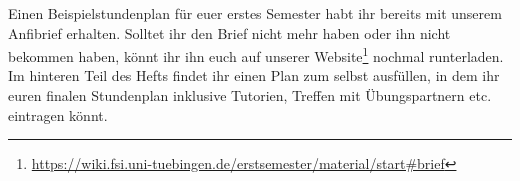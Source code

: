 Einen Beispielstundenplan für euer erstes Semester habt ihr bereits mit unserem Anfibrief erhalten. Solltet ihr den Brief nicht mehr haben oder ihn nicht bekommen haben, könnt ihr ihn euch auf unserer Website\footnote{\url{https://wiki.fsi.uni-tuebingen.de/erstsemester/material/start\#brief}} nochmal runterladen.\\
Im hinteren Teil des Hefts findet ihr einen Plan zum selbst ausfüllen, in dem ihr euren finalen Stundenplan inklusive Tutorien, Treffen mit Übungspartnern etc. eintragen könnt.

